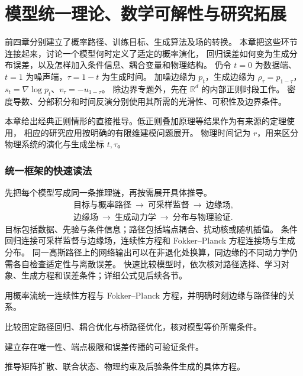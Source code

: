 \chapter{模型统一理论、数学可解性与研究拓展}
\label{ch:unified}

前四章分别建立了概率路径、训练目标、生成算法及场的转换。
本章把这些环节连接起来，讨论一个模型何时定义了适定的概率演化，
回归误差如何变为生成分布误差，以及怎样加入条件信息、耦合变量和物理结构。
仍令 \(t=0\) 为数据端、\(t=1\) 为噪声端，\(\tau=1-t\) 为生成时间。
加噪边缘为 \(p_t\)，生成边缘为 \(\rho_\tau=p_{1-\tau}\)，
\(s_t=\nabla\log p_t\)、\(v_\tau=-u_{1-\tau}\)。
除边界专题外，先在 \(\mathbb R^d\) 的内部正则时段工作。
密度导数、分部积分和时间反演分别使用其所需的光滑性、可积性及边界条件。

本章给出经典正则情形的直接推导。低正则叠加原理等结果作为有来源的定理使用，
相应的研究应用按明确的有限维建模问题展开。
物理时间记为 \(r\)，用来区分物理系统的演化与生成坐标 \(t,\tau\)。

\subsection*{统一框架的快速读法}

先把每个模型写成同一条推理链，再按需展开具体推导。
\[
 \begin{gathered}
 \text{目标与概率路径}\ \longrightarrow\ \text{可采样监督}\ \longrightarrow\ \text{边缘场},\\
 \text{边缘场}\ \longrightarrow\ \text{生成动力学}\ \longrightarrow\ \text{分布与物理验证}.
 \end{gathered}
\]
目标包括数据、先验与条件信息；路径包括端点耦合、扰动核或随机插值。
条件回归连接可采样监督与边缘场，连续性方程和 Fokker--Planck 方程连接场与生成分布。
同一高斯路径上的网络输出可以在非退化处换算，同边缘的不同动力学仍需各自检查适定性与离散误差。
快速比较模型时，依次核对路径选择、学习对象、生成方程和误差条件；详细公式见后续各节。

\begin{learningobjectives}
 \item 用概率流统一连续性方程与 Fokker--Planck 方程，并明确时刻边缘与路径律的关系。
 \item 比较固定路径回归、耦合优化与桥路径优化，核对模型等价所需条件。
 \item 建立存在唯一性、端点极限和误差传播的可验证条件。
 \item 推导矩阵扩散、联合状态、物理约束及后验条件生成的具体方程。
\end{learningobjectives}

